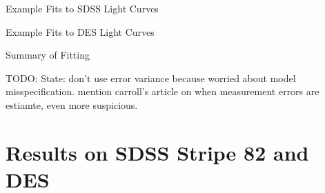 \documentclass[12pt]{beamer}
\newcommand{\todo}[1]{{\color{red}TODO: #1}}
\begin{document}
\begin{frame}{Example Fits to SDSS Light Curves}

\end{frame}

\begin{frame}{Example Fits to DES Light Curves}

\end{frame}

\begin{frame}{Summary of Fitting}

  \todo{State: don't use error variance because worried about model misspecification. mention carroll's article on when measurement errors are estiamte, even more suspicious.} 
  
\end{frame}





\section{Results on SDSS Stripe 82 and DES}
\end{document}
